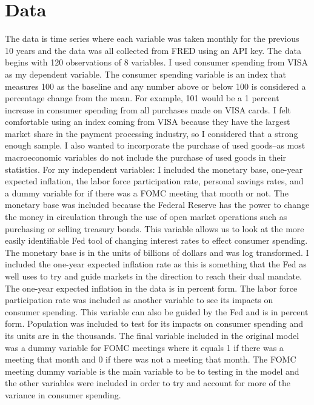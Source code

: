 \documentclass[12pt,english]{article}
\begin{document}
\section{Data}\label{sec:data}
The data is time series where each variable was taken monthly for the previous 10 years and the data was all collected from FRED using an API key. The data begins with 120 observations of 8 variables. I used consumer spending from VISA as my dependent variable. The consumer spending variable is an index that measures 100 as the baseline and any number above or below 100 is considered a percentage change from the mean. For example, 101 would be a 1 percent increase in consumer spending from all purchases made on VISA cards. I felt comfortable using an index coming from VISA because they have the largest market share in the payment processing industry, so I considered that a strong enough sample. I also wanted to incorporate the purchase of used goods--as most macroeconomic variables do not include the purchase of used goods in their statistics. For my independent variables: I included the monetary base, one-year expected inflation, the labor force participation rate, personal savings rates, and a dummy variable for if there was a FOMC meeting that month or not. The monetary base was included because the Federal Reserve has the power to change the money in circulation through the use of open market operations such as purchasing or selling treasury bonds. This variable allows us to look at the more easily identifiable Fed tool of changing interest rates to effect consumer spending. The monetary base is in the units of billions of dollars and was log transformed. I included the one-year expected inflation rate as this is something that the Fed as well uses to try and guide markets in the direction to reach their dual mandate. The one-year expected inflation in the data is in percent form. The labor force participation rate was included as another variable to see its impacts on consumer spending. This variable can also be guided by the Fed and is in percent form. Population was included to test for its impacts on consumer spending and its units are in the thousands. The final variable included in the original model was a dummy variable for FOMC meetings where it equals 1 if there was a meeting that month and 0 if there was not a meeting that month. The FOMC meeting dummy variable is the main variable to be to testing in the model and the other variables were included in order to try and account for more of the variance in consumer spending. 
\end{document}
